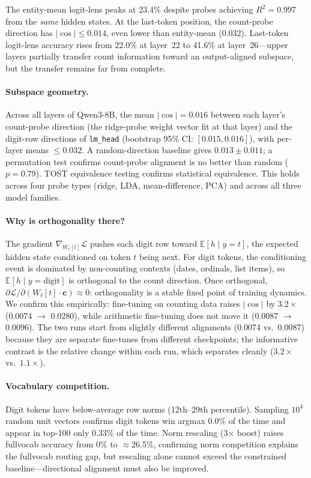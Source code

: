 \documentclass{article}
\begin{document}
The entity-mean logit-lens peaks at 23.4\% despite probes achieving $R^2 =
0.997$ from the \emph{same} hidden states. At the last-token position, the
count-probe direction has $|\cos| \leq 0.014$, even lower than entity-mean
($0.032$). Last-token logit-lens accuracy rises from 22.0\% at layer~22 to
41.6\% at layer~26---upper layers partially transfer count information toward an
output-aligned subspace, but the transfer remains far from complete.

\paragraph{Subspace geometry.}
Across all layers of Qwen3-8B, the mean $|\cos| = 0.016$ between each layer's
count-probe direction (the ridge-probe weight vector fit at that layer) and the
digit-row directions of \texttt{lm\_head} (bootstrap 95\% CI: $[0.015, 0.016]$),
with per-layer means $\leq 0.032$. A
random-direction baseline gives $0.013 \pm 0.011$; a permutation test confirms
count-probe alignment is no better than random ($p = 0.79$). TOST equivalence
testing confirms statistical equivalence. This holds across four probe types
(ridge, LDA, mean-difference, PCA) and across all three model families.

\paragraph{Why is orthogonality there?}
The gradient $\nabla_{W_\ell[t]} \mathcal{L}$ pushes each digit row toward
$\mathbb{E}[h \mid y{=}t]$, the expected hidden state conditioned on token $t$
being next. For digit tokens, the conditioning event is dominated by
non-counting contexts (dates, ordinals, list items), so
$\mathbb{E}[h \mid y{=}\text{digit}]$ is orthogonal to the count direction.
Once orthogonal, $\partial\mathcal{L}/\partial(W_\ell[t]\cdot\mathbf{c})
\approx 0$: orthogonality is a stable fixed point of training dynamics.
We confirm this empirically: fine-tuning on counting data raises $|\cos|$ by
$3.2\times$ (0.0074 $\to$ 0.0280), while arithmetic fine-tuning does not move
it (0.0087 $\to$ 0.0096). The two runs start from slightly different alignments
(0.0074 vs.\ 0.0087) because they are separate fine-tunes from different
checkpoints; the informative contrast is the relative change within each run,
which separates cleanly ($3.2\times$ vs.\ $1.1\times$).

\paragraph{Vocabulary competition.}
Digit tokens have below-average row norms (12th--29th percentile). Sampling
$10^4$ random unit vectors confirms digit tokens win argmax 0.0\% of the time
and appear in top-100 only 0.33\% of the time. Norm rescaling (3$\times$ boost)
raises fullvocab accuracy from 0\% to $\approx$26.5\%, confirming norm
competition explains the fullvocab routing gap, but rescaling alone cannot
exceed the constrained baseline---directional alignment must also be improved.
\end{document}
